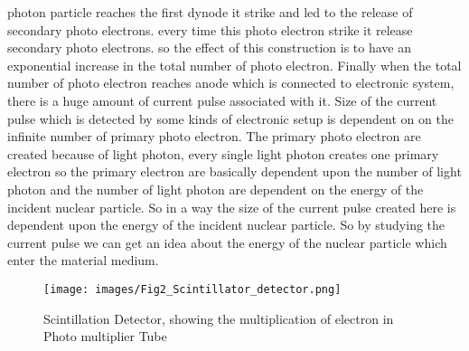 \documentclass{article}
\begin{document}
\begin{multicols}{2}
photon particle reaches the first dynode it strike and led to the release of secondary photo electrons. every time this photo electron strike it release secondary photo electrons. so the effect of this construction is to have an exponential increase in the total number of photo electron. Finally when the total number of photo electron reaches anode which is connected to electronic system, there is a huge amount of current pulse associated with it. Size of the current pulse which is detected by some kinds of electronic setup is dependent on on the infinite number of primary photo electron. The primary photo electron  are created because of light photon, every single light photon creates one primary electron so the primary electron are basically dependent upon the number of light photon and the number of light photon are dependent on the energy of the incident nuclear particle. So in a way the size of the current pulse created here is dependent upon the energy of the incident nuclear particle. So by studying the current pulse we can get an idea about the energy of the nuclear particle which enter the material medium.
\end{multicols}
\begin{figure}[H]
    \centering
    \texttt{[image: images/Fig2\_Scintillator\_detector.png]}
    \caption{Scintillation Detector, showing the multiplication of electron in Photo multiplier Tube}
    \label{fig:2}
\end{figure}
\end{document}
